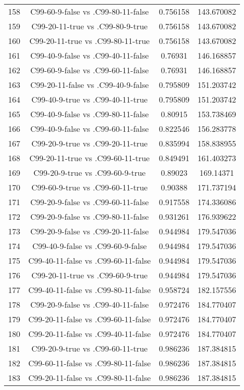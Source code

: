 \documentclass[a4paper,10pt]{article}
\begin{document}
\begin{landscape}
\begin{table}[!htp]
\begin{tabular}{cccc}
158&C99-60-9-false vs .C99-80-11-false&0.756158&143.670082\\
159&C99-20-11-true vs .C99-80-9-true&0.756158&143.670082\\
160&C99-20-11-true vs .C99-80-11-true&0.756158&143.670082\\
161&C99-40-9-false vs .C99-40-11-false&0.76931&146.168857\\
162&C99-60-9-false vs .C99-60-11-false&0.76931&146.168857\\
163&C99-20-11-false vs .C99-40-9-false&0.795809&151.203742\\
164&C99-40-9-true vs .C99-40-11-true&0.795809&151.203742\\
165&C99-40-9-false vs .C99-80-11-false&0.80915&153.738469\\
166&C99-40-9-false vs .C99-60-11-false&0.822546&156.283778\\
167&C99-20-9-true vs .C99-20-11-true&0.835994&158.838955\\
168&C99-20-11-true vs .C99-60-11-true&0.849491&161.403273\\
169&C99-20-9-true vs .C99-60-9-true&0.89023&169.14371\\
170&C99-60-9-true vs .C99-60-11-true&0.90388&171.737194\\
171&C99-20-9-false vs .C99-60-11-false&0.917558&174.336086\\
172&C99-20-9-false vs .C99-80-11-false&0.931261&176.939622\\
173&C99-20-9-false vs .C99-20-11-false&0.944984&179.547036\\
174&C99-40-9-false vs .C99-60-9-false&0.944984&179.547036\\
175&C99-40-11-false vs .C99-60-11-false&0.944984&179.547036\\
176&C99-20-11-true vs .C99-60-9-true&0.944984&179.547036\\
177&C99-40-11-false vs .C99-80-11-false&0.958724&182.157556\\
178&C99-20-9-false vs .C99-40-11-false&0.972476&184.770407\\
179&C99-20-11-false vs .C99-60-11-false&0.972476&184.770407\\
180&C99-20-11-false vs .C99-40-11-false&0.972476&184.770407\\
181&C99-20-9-true vs .C99-60-11-true&0.986236&187.384815\\
182&C99-60-11-false vs .C99-80-11-false&0.986236&187.384815\\
183&C99-20-11-false vs .C99-80-11-false&0.986236&187.384815\\

\end{tabular}
\end{table}
\end{landscape}
\end{document}
